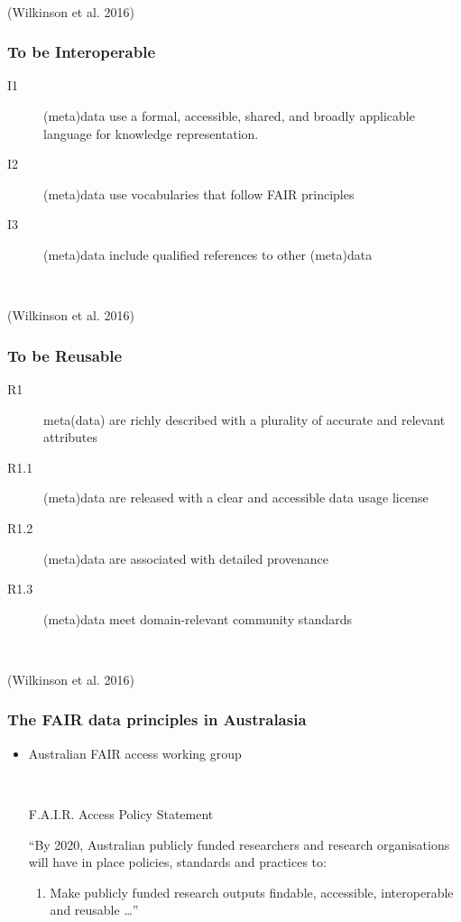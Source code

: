 \documentclass[pdf,sprung,slideColor,nocolorBG]{beamer}
\newenvironment{colortheme}[1]{
\def\ProvidesPackageRCS $##1${\relax}
\renewcommand{\ProcessOptions}{\relax}
\makeatletter

\makeatother
}{}
\newcommand{\slidecite}[1]{\tiny{(#1)}\normalsize{}}
\begin{document}
\begin{colortheme}{jubata}
\begin{frame}
~

\slidecite{Wilkinson et al. 2016}
\end{frame}
\begin{frame}
\frametitle{To be Interoperable}
\begin{description}
 \item[I1] (meta)data use a formal, accessible, shared, and broadly applicable language for knowledge representation.
 \item[I2] (meta)data use vocabularies that follow FAIR principles
 \item[I3] (meta)data include qualified references to other (meta)data
\end{description}

~

\slidecite{Wilkinson et al. 2016}
\end{frame}
\begin{frame}
\frametitle{To be Reusable}
\begin{description}
 \item[R1] meta(data) are richly described with a plurality of accurate and relevant attributes
 \item[R1.1] (meta)data are released with a clear and accessible data usage license
 \item[R1.2] (meta)data are associated with detailed provenance
 \item[R1.3] (meta)data meet domain-relevant community standards

\end{description}

~

\slidecite{Wilkinson et al. 2016}
\end{frame}
\begin{frame}
\frametitle{The FAIR data principles in Australasia}

\begin{itemize}
 \item 
Australian FAIR access working group

~

\footnotesize
 F.A.I.R. Access Policy Statement


 ``By 2020, Australian publicly funded researchers and research organisations will have in place policies, standards and practices to:
\begin{enumerate}
 \item Make publicly funded research outputs findable, accessible, interoperable and reusable \ldots''
\end{enumerate}
\normalsize


\end{itemize}
\end{frame}
\end{colortheme}
\end{document}
